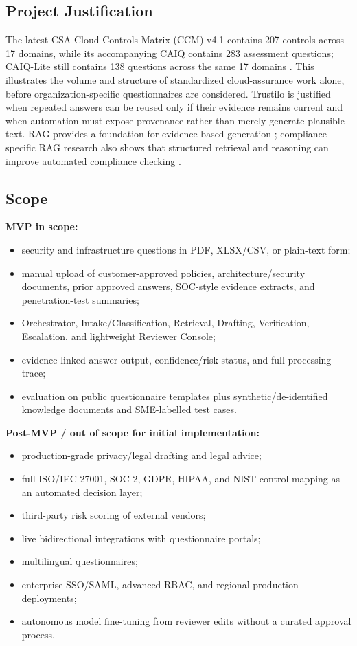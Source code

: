 \documentclass[11pt,journal,onecolumn]{IEEEtran}
\begin{document}
\subsection{Project Justification}
The latest CSA Cloud Controls Matrix (CCM) v4.1 contains 207 controls across 17 domains, while its accompanying CAIQ contains 283 assessment questions; CAIQ-Lite still contains 138 questions across the same 17 domains \cite{csa2026ccm,csa2026lite}. This illustrates the volume and structure of standardized cloud-assurance work alone, before organization-specific questionnaires are considered. Trustilo is justified when repeated answers can be reused only if their evidence remains current and when automation must expose provenance rather than merely generate plausible text. RAG provides a foundation for evidence-based generation \cite{lewis2020rag}; compliance-specific RAG research also shows that structured retrieval and reasoning can improve automated compliance checking \cite{sun2025compliance}.

\subsection{Scope}
\textbf{MVP in scope:}
\begin{itemize}[leftmargin=1.7em]
    \item security and infrastructure questions in PDF, XLSX/CSV, or plain-text form;
    \item manual upload of customer-approved policies, architecture/security documents, prior approved answers, SOC-style evidence extracts, and penetration-test summaries;
    \item Orchestrator, Intake/Classification, Retrieval, Drafting, Verification, Escalation, and lightweight Reviewer Console;
    \item evidence-linked answer output, confidence/risk status, and full processing trace;
    \item evaluation on public questionnaire templates plus synthetic/de-identified knowledge documents and SME-labelled test cases.
\end{itemize}

\textbf{Post-MVP / out of scope for initial implementation:}
\begin{itemize}[leftmargin=1.7em]
    \item production-grade privacy/legal drafting and legal advice;
    \item full ISO/IEC 27001, SOC 2, GDPR, HIPAA, and NIST control mapping as an automated decision layer;
    \item third-party risk scoring of external vendors;
    \item live bidirectional integrations with questionnaire portals;
    \item multilingual questionnaires;
    \item enterprise SSO/SAML, advanced RBAC, and regional production deployments;
    \item autonomous model fine-tuning from reviewer edits without a curated approval process.
\end{itemize}
\end{document}
